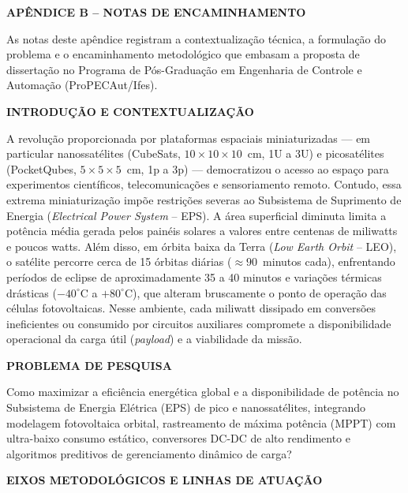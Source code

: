 \newpage
\noindent\textbf{APÊNDICE B -- NOTAS DE ENCAMINHAMENTO}
\vspace{0.5cm}

\noindent As notas deste apêndice registram a contextualização técnica, a formulação do problema e o encaminhamento metodológico que embasam a proposta de dissertação no Programa de Pós-Graduação em Engenharia de Controle e Automação (ProPECAut/Ifes).

\vspace{0.3cm}
\noindent\textbf{INTRODUÇÃO E CONTEXTUALIZAÇÃO}

\noindent A revolução proporcionada por plataformas espaciais miniaturizadas — em particular nanossatélites (CubeSats, $10 \times 10 \times 10$~cm, 1U a 3U) e picosatélites (PocketQubes, $5 \times 5 \times 5$~cm, 1p a 3p) — democratizou o acesso ao espaço para experimentos científicos, telecomunicações e sensoriamento remoto. Contudo, essa extrema miniaturização impõe restrições severas ao Subsistema de Suprimento de Energia (\textit{Electrical Power System} -- EPS). A área superficial diminuta limita a potência média gerada pelos painéis solares a valores entre centenas de miliwatts e poucos watts. Além disso, em órbita baixa da Terra (\textit{Low Earth Orbit} -- LEO), o satélite percorre cerca de 15 órbitas diárias ($\approx 90$~minutos cada), enfrentando períodos de eclipse de aproximadamente 35 a 40 minutos e variações térmicas drásticas ($-40^\circ$C a $+80^\circ$C), que alteram bruscamente o ponto de operação das células fotovoltaicas. Nesse ambiente, cada miliwatt dissipado em conversões ineficientes ou consumido por circuitos auxiliares compromete a disponibilidade operacional da carga útil (\textit{payload}) e a viabilidade da missão.

\vspace{0.3cm}
\noindent\textbf{PROBLEMA DE PESQUISA}

\noindent Como maximizar a eficiência energética global e a disponibilidade de potência no Subsistema de Energia Elétrica (EPS) de pico e nanossatélites, integrando modelagem fotovoltaica orbital, rastreamento de máxima potência (MPPT) com ultra-baixo consumo estático, conversores DC-DC de alto rendimento e algoritmos preditivos de gerenciamento dinâmico de carga?

\vspace{0.3cm}
\noindent\textbf{EIXOS METODOLÓGICOS E LINHAS DE ATUAÇÃO}

